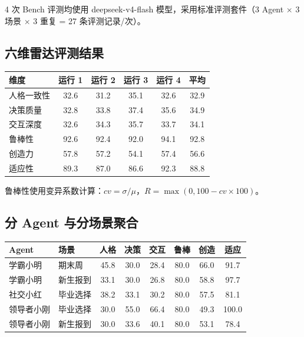 \documentclass[12pt,a4paper]{article}%
\begin{document}
4 次 Bench 评测均使用 deepseek-v4-flash 模型，采用标准评测套件（3 Agent $\times$ 3 场景 $\times$ 3 重复 = 27 条评测记录/次）。

\subsection{六维雷达评测结果}

\begin{table}[H]
	\centering
	\small
	\begin{tabular}{lccccc}
		\toprule
		\textbf{维度} & \textbf{运行 1} & \textbf{运行 2} & \textbf{运行 3} & \textbf{运行 4} & \textbf{平均} \\
		\midrule
		人格一致性 & 32.6 & 31.2 & 35.1 & 32.6 & 32.9 \\
		决策质量 & 32.8 & 33.8 & 37.4 & 35.6 & 34.9 \\
		交互深度 & 32.6 & 34.3 & 35.7 & 33.7 & 34.1 \\
		鲁棒性 & 92.6 & 92.4 & 92.0 & 94.1 & 92.8 \\
		创造力 & 57.8 & 57.2 & 54.1 & 57.4 & 56.6 \\
		适应性 & 89.3 & 87.0 & 86.6 & 92.3 & 88.8 \\
		\bottomrule
	\end{tabular}
\end{table}

鲁棒性使用变异系数计算：$cv = \sigma/\mu$，$R = \max(0, 100 - cv \times 100)$。

\subsection{分 Agent 与分场景聚合}

\begin{table}[H]
	\centering
	\small
	\begin{tabular}{llcccccc}
		\toprule
		\textbf{Agent} & \textbf{场景} & \textbf{人格} & \textbf{决策} & \textbf{交互} & \textbf{鲁棒} & \textbf{创造} & \textbf{适应} \\
		\midrule
		学霸小明 & 期末周 & 45.8 & 30.0 & 28.4 & 80.0 & 66.0 & 91.7 \\
		学霸小明 & 新生报到 & 33.1 & 30.0 & 26.8 & 80.0 & 58.8 & 97.7 \\
		社交小红 & 毕业选择 & 38.2 & 33.1 & 30.2 & 80.0 & 57.5 & 81.1 \\
		领导者小刚 & 毕业选择 & 30.0 & 55.0 & 66.4 & 80.0 & 49.3 & 100.0 \\
		领导者小刚 & 新生报到 & 30.0 & 33.6 & 40.1 & 80.0 & 53.1 & 78.4 \\
		\bottomrule
	\end{tabular}
\end{table}
\end{document}
